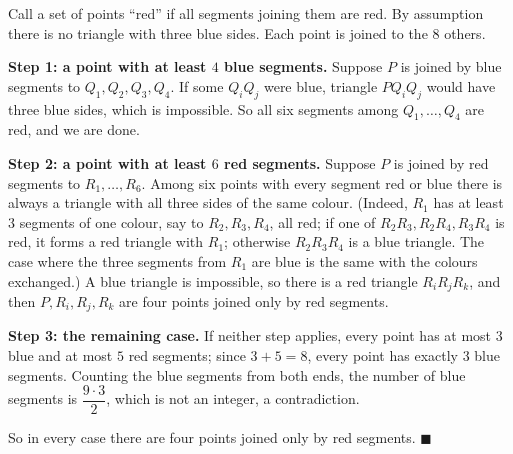 Call a set of points ``red'' if all segments joining them are red. By assumption there is no triangle with three blue sides. Each point is joined to the $8$ others.

\textbf{Step 1: a point with at least $4$ blue segments.} Suppose $P$ is joined by blue segments to $Q_1,Q_2,Q_3,Q_4$. If some $Q_iQ_j$ were blue, triangle $PQ_iQ_j$ would have three blue sides, which is impossible. So all six segments among $Q_1,\dots,Q_4$ are red, and we are done.

\textbf{Step 2: a point with at least $6$ red segments.} Suppose $P$ is joined by red segments to $R_1,\dots,R_6$. Among six points with every segment red or blue there is always a triangle with all three sides of the same colour. (Indeed, $R_1$ has at least $3$ segments of one colour, say to $R_2,R_3,R_4$, all red; if one of $R_2R_3,R_2R_4,R_3R_4$ is red, it forms a red triangle with $R_1$; otherwise $R_2R_3R_4$ is a blue triangle. The case where the three segments from $R_1$ are blue is the same with the colours exchanged.) A blue triangle is impossible, so there is a red triangle $R_iR_jR_k$, and then $P,R_i,R_j,R_k$ are four points joined only by red segments.

\textbf{Step 3: the remaining case.} If neither step applies, every point has at most $3$ blue and at most $5$ red segments; since $3+5=8$, every point has exactly $3$ blue segments. Counting the blue segments from both ends, the number of blue segments is $\dfrac{9\cdot3}{2}$, which is not an integer, a contradiction.

So in every case there are four points joined only by red segments. $\blacksquare$
